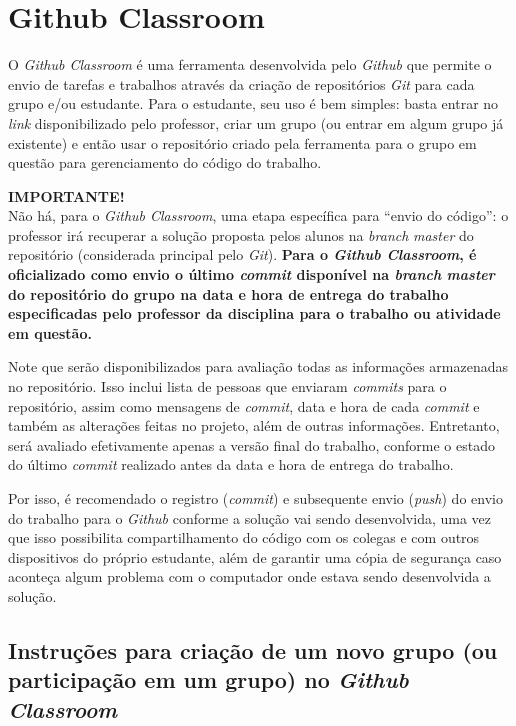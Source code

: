 \documentclass[11pt]{article}
\newcommand*{\alert}[1]{\vspace{0.4cm}\colorbox{gray!60!white}{\parbox{0.92\linewidth}{{\centering \textbf{IMPORTANTE!}\\}#1}}\vspace{0.4cm}}
\begin{document}
\section{Github Classroom}

O \textit{Github Classroom} é uma ferramenta desenvolvida pelo \textit{Github} que permite o envio de tarefas e trabalhos através da criação de repositórios \textit{Git} para cada grupo e/ou estudante. Para o estudante, seu uso é bem simples: basta entrar no \textit{link} disponibilizado pelo professor, criar um grupo (ou entrar em algum grupo já existente) e então usar o repositório criado pela ferramenta para o grupo em questão para gerenciamento do código do trabalho.

\alert{Não há, para o \textit{Github Classroom}, uma etapa específica para ``envio do código'': o professor irá recuperar a solução proposta pelos alunos na \textit{branch} \textit{master} do repositório (considerada principal pelo \textit{Git}). \textbf{Para o \textit{Github Classroom}, é oficializado como envio o último \textit{commit} disponível na \textit{branch} \textit{master} do repositório do grupo na data e hora de entrega do trabalho especificadas pelo professor da disciplina para o trabalho ou atividade em questão.}}

Note que serão disponibilizados para avaliação todas as informações armazenadas no repositório. Isso inclui lista de pessoas que enviaram \textit{commits} para o repositório, assim como mensagens de \textit{commit}, data e hora de cada \textit{commit} e também as alterações feitas no projeto, além de outras informações. Entretanto, será avaliado efetivamente apenas a versão final do trabalho, conforme o estado do último \textit{commit} realizado antes da data e hora de entrega do trabalho.

Por isso, é recomendado o registro (\textit{commit}) e subsequente envio (\textit{push}) do envio do trabalho para o \textit{Github} conforme a solução vai sendo desenvolvida, uma vez que isso possibilita compartilhamento do código com os colegas e com outros dispositivos do próprio estudante, além de garantir uma cópia de segurança caso aconteça algum problema com o computador onde estava sendo desenvolvida a solução.

\subsection{Instruções para criação de um novo grupo (ou participação em um grupo) no \textit{Github Classroom}}
\end{document}
